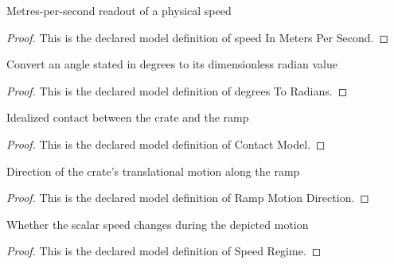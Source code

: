 \begin{definition}
  \label{def:physics:phyx-mini-0759:phyxminiproblems-problemphyxmini0759-speedinmeterspersecond}
  Metres-per-second readout of a physical speed
\end{definition}
\begin{proof}
  This is the declared model definition of speed In Meters Per Second.
\end{proof}
\begin{definition}
  \label{def:physics:phyx-mini-0759:phyxminiproblems-problemphyxmini0759-degreestoradians}
  Convert an angle stated in degrees to its dimensionless radian value
\end{definition}
\begin{proof}
  This is the declared model definition of degrees To Radians.
\end{proof}
\begin{definition}
  \label{def:physics:phyx-mini-0759:phyxminiproblems-problemphyxmini0759-contactmodel}
  Idealized contact between the crate and the ramp
\end{definition}
\begin{proof}
  This is the declared model definition of Contact Model.
\end{proof}
\begin{definition}
  \label{def:physics:phyx-mini-0759:phyxminiproblems-problemphyxmini0759-rampmotiondirection}
  Direction of the crate's translational motion along the ramp
\end{definition}
\begin{proof}
  This is the declared model definition of Ramp Motion Direction.
\end{proof}
\begin{definition}
  \label{def:physics:phyx-mini-0759:phyxminiproblems-problemphyxmini0759-speedregime}
  Whether the scalar speed changes during the depicted motion
\end{definition}
\begin{proof}
  This is the declared model definition of Speed Regime.
\end{proof}
